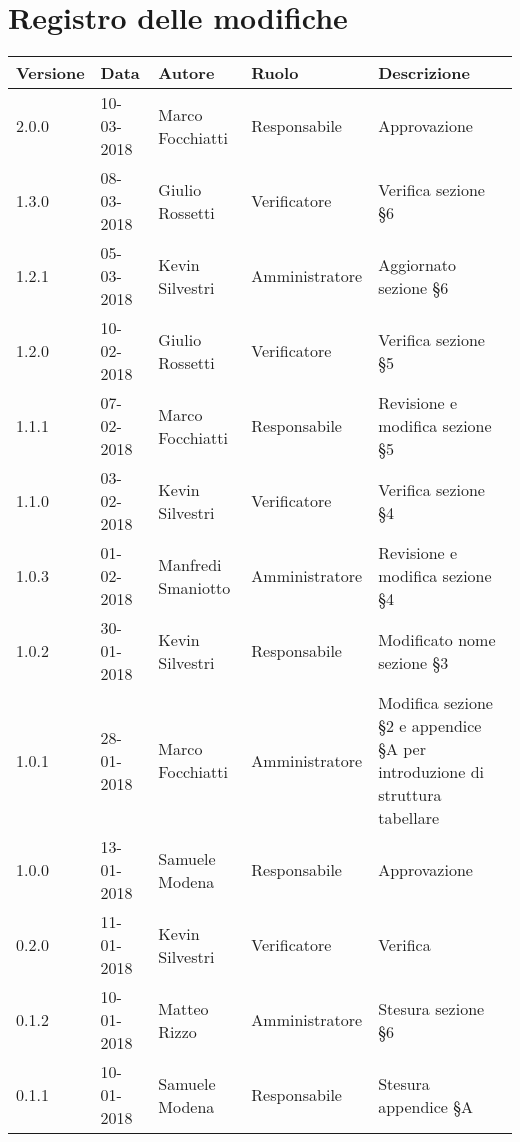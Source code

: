 \documentclass[./PianodiProgetto.tex]{subfiles}
\begin{document}
\chapter*{Registro delle modifiche}
\setlength\LTleft{-22mm}
\begin{longtable}{|p{20mm}|p{20mm}|p{40mm}|p{30mm}|p{50mm}|}
	\hline
	\textbf{Versione} & \textbf{Data} & \textbf{Autore} & \textbf{Ruolo} & \textbf{Descrizione} \\ 
		\hline 2.0.0 & 10-03-2018 & Marco Focchiatti & Responsabile & Approvazione \\
		
		\hline 1.3.0 & 08-03-2018 & Giulio Rossetti & Verificatore & Verifica sezione §6 \\
		
		\hline 1.2.1 & 05-03-2018 & Kevin Silvestri & Amministratore & Aggiornato sezione §6 \\
		
		\hline 1.2.0 & 10-02-2018 & Giulio Rossetti & Verificatore & Verifica sezione §5 \\
		
		\hline 1.1.1 & 07-02-2018 & Marco Focchiatti & Responsabile & Revisione e modifica sezione §5 \\
		
		\hline 1.1.0 & 03-02-2018 & Kevin Silvestri & Verificatore & Verifica sezione §4 \\
				
		\hline 1.0.3 & 01-02-2018 & Manfredi Smaniotto & Amministratore & Revisione e modifica sezione §4 \\
		
		\hline 1.0.2 & 30-01-2018 & Kevin Silvestri & Responsabile & Modificato nome sezione §3 \\
		
		\hline 1.0.1 & 28-01-2018 & Marco Focchiatti & Amministratore & Modifica sezione §2 e appendice §A per introduzione di struttura tabellare \\
	
		\hline 1.0.0 & 13-01-2018 & Samuele Modena & Responsabile & Approvazione \\
 
		\hline 0.2.0 & 11-01-2018 & Kevin Silvestri & Verificatore & Verifica \\
 
		\hline 0.1.2 & 10-01-2018 & Matteo Rizzo & Amministratore & Stesura sezione §6 \\
 
		\hline 0.1.1 & 10-01-2018 & Samuele Modena & Responsabile & Stesura appendice §A \\
 

\end{longtable}
\end{document}
